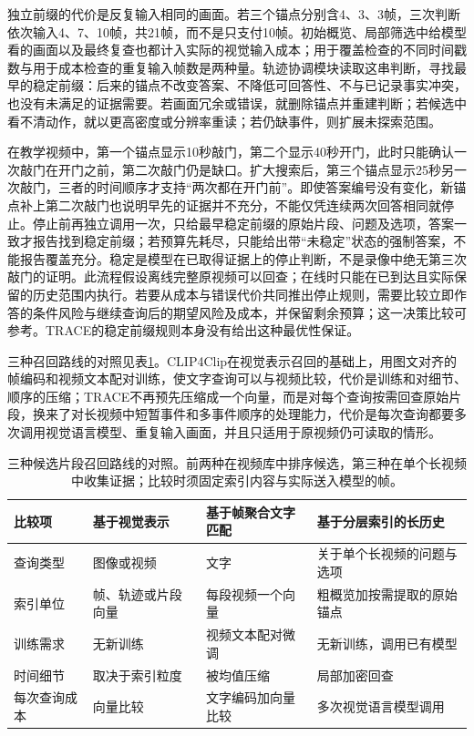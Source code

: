 独立前缀的代价是反复输入相同的画面。若三个锚点分别含4、3、3帧，三次判断依次输入4、7、10帧，共21帧，而不是只支付10帧。初始概览、局部筛选中给模型看的画面以及最终复查也都计入实际的视觉输入成本；用于覆盖检查的不同时间戳数与用于成本检查的重复输入帧数是两种量。轨迹协调模块读取这串判断，寻找最早的稳定前缀：后来的锚点不改变答案、不降低可回答性、不与已记录事实冲突，也没有未满足的证据需要。若画面冗余或错误，就删除锚点并重建判断；若候选中看不清动作，就以更高密度或分辨率重读；若仍缺事件，则扩展未探索范围。

在教学视频中，第一个锚点显示10秒敲门，第二个显示40秒开门，此时只能确认一次敲门在开门之前，第二次敲门仍是缺口。扩大搜索后，第三个锚点显示25秒另一次敲门，三者的时间顺序才支持“两次都在开门前”。即使答案编号没有变化，新锚点补上第二次敲门也说明早先的证据并不充分，不能仅凭连续两次回答相同就停止。停止前再独立调用一次，只给最早稳定前缀的原始片段、问题及选项，答案一致才报告找到稳定前缀；若预算先耗尽，只能给出带“未稳定”状态的强制答案，不能报告覆盖充分。稳定是模型在已取得证据上的停止判断，不是录像中绝无第三次敲门的证明。此流程假设离线完整原视频可以回查；在线时只能在已到达且实际保留的历史范围内执行。若要从成本与错误代价共同推出停止规则，需要比较立即作答的条件风险与继续查询后的期望风险及成本，并保留剩余预算；这一决策比较可参考。TRACE的稳定前缀规则本身没有给出这种最优性保证。

三种召回路线的对照见表\ref{tab:vision-video-retrieval-compare}。CLIP4Clip在视觉表示召回的基础上，用图文对齐的帧编码和视频文本配对训练，使文字查询可以与视频比较，代价是训练和对细节、顺序的压缩；TRACE不再预先压缩成一个向量，而是对每个查询按需回查原始片段，换来了对长视频中短暂事件和多事件顺序的处理能力，代价是每次查询都要多次调用视觉语言模型、重复输入画面，并且只适用于原视频仍可读取的情形。

\begin{table}[htbp]
  \centering
  \small
  \begin{tabularx}{\linewidth}{@{}lXXX@{}}
    \toprule
    比较项 & 基于视觉表示 & 基于帧聚合文字匹配 & 基于分层索引的长历史\\
    \midrule
    查询类型 & 图像或视频 & 文字 & 关于单个长视频的问题与选项\\
    索引单位 & 帧、轨迹或片段向量 & 每段视频一个向量 & 粗概览加按需提取的原始锚点\\
    训练需求 & 无新训练 & 视频文本配对微调 & 无新训练，调用已有模型\\
    时间细节 & 取决于索引粒度 & 被均值压缩 & 局部加密回查\\
    每次查询成本 & 向量比较 & 文字编码加向量比较 & 多次视觉语言模型调用\\
    \bottomrule
  \end{tabularx}
  \caption{三种候选片段召回路线的对照。前两种在视频库中排序候选，第三种在单个长视频中收集证据；比较时须固定索引内容与实际送入模型的帧。}
  \label{tab:vision-video-retrieval-compare}
\end{table}

